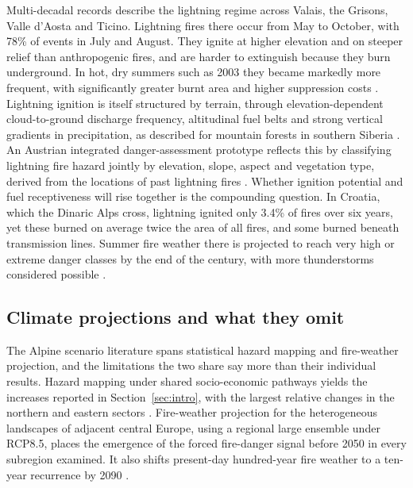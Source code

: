 \documentclass[11pt,a4paper]{article}
\begin{document}
Multi-decadal records describe the lightning regime across Valais, the Grisons, Valle d'Aosta and Ticino. Lightning fires there occur from May to October, with 78\% of events in July and August. They ignite at higher elevation and on steeper relief than anthropogenic fires, and are harder to extinguish because they burn underground. In hot, dry summers such as 2003 they became markedly more frequent, with significantly greater burnt area and higher suppression costs \citep{conedera_lightninginduced_2006}. Lightning ignition is itself structured by terrain, through elevation-dependent cloud-to-ground discharge frequency, altitudinal fuel belts and strong vertical gradients in precipitation, as described for mountain forests in southern Siberia \citep{baranovskiy_deterministic_2021}. An Austrian integrated danger-assessment prototype reflects this by classifying lightning fire hazard jointly by elevation, slope, aspect and vegetation type, derived from the locations of past lightning fires \citep{muller_towards_2020}. Whether ignition potential and fuel receptiveness will rise together is the compounding question. In Croatia, which the Dinaric Alps cross, lightning ignited only 3.4\% of fires over six years, yet these burned on average twice the area of all fires, and some burned beneath transmission lines. Summer fire weather there is projected to reach very high or extreme danger classes by the end of the century, with more thunderstorms considered possible \citep{bozicek_impact_2023}.

\subsection{Climate projections and what they omit}

The Alpine scenario literature spans statistical hazard mapping and fire-weather projection, and the limitations the two share say more than their individual results. Hazard mapping under shared socio-economic pathways yields the increases reported in Section~\ref{sec:intro}, with the largest relative changes in the northern and eastern sectors \citep{gerberding_mapping_2025}. Fire-weather projection for the heterogeneous landscapes of adjacent central Europe, using a regional large ensemble under RCP8.5, places the emergence of the forced fire-danger signal before 2050 in every subregion examined. It also shifts present-day hundred-year fire weather to a ten-year recurrence by 2090 \citep{miller_climate_2024}.
\end{document}
